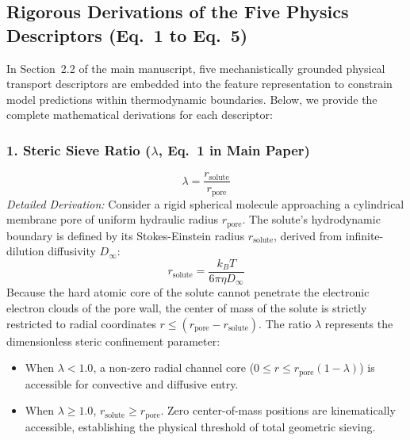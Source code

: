 \documentclass[11pt]{article}
\begin{document}
\subsection{Rigorous Derivations of the Five Physics Descriptors (Eq.~1 to Eq.~5)}
\label{sec:physics_descriptors_derivation}

In Section~2.2 of the main manuscript, five mechanistically grounded physical transport descriptors are embedded into the feature representation to constrain model predictions within thermodynamic boundaries. Below, we provide the complete mathematical derivations for each descriptor:

\subsubsection{1. Steric Sieve Ratio ($\lambda$, Eq.~1 in Main Paper)}
\begin{equation}
\lambda = \frac{r_{\mathrm{solute}}}{r_{\mathrm{pore}}}
\label{eq:s_lambda}
\end{equation}
\noindent\textit{Detailed Derivation:} Consider a rigid spherical molecule approaching a cylindrical membrane pore of uniform hydraulic radius $r_{\mathrm{pore}}$. The solute's hydrodynamic boundary is defined by its Stokes-Einstein radius $r_{\mathrm{solute}}$, derived from infinite-dilution diffusivity $D_\infty$:
\begin{equation}
r_{\mathrm{solute}} = \frac{k_B T}{6 \pi \eta D_\infty}
\label{eq:s_stokes_einstein}
\end{equation}
Because the hard atomic core of the solute cannot penetrate the electronic electron clouds of the pore wall, the center of mass of the solute is strictly restricted to radial coordinates $r \le (r_{\mathrm{pore}} - r_{\mathrm{solute}})$. The ratio $\lambda$ represents the dimensionless steric confinement parameter:
\begin{itemize}[leftmargin=1.0cm]
    \item When $\lambda < 1.0$, a non-zero radial channel core ($0 \le r \le r_{\mathrm{pore}}(1 - \lambda)$) is accessible for convective and diffusive entry.
    \item When $\lambda \ge 1.0$, $r_{\mathrm{solute}} \ge r_{\mathrm{pore}}$. Zero center-of-mass positions are kinematically accessible, establishing the physical threshold of total geometric sieving.
\end{itemize}
\end{document}
